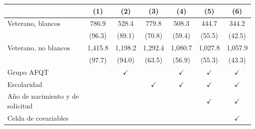 
\begin{tabular}{lcccccc}
\toprule
 & (1) & (2) & (3) & (4) & (5) & (6)\\
\midrule
Veterano, blancos & 786.9 & 528.4 & 779.8 & 508.3 & 444.7 & 344.2\\
 & (96.3) & (89.1) & (70.8) & (59.4) & (55.5) & (42.5)\\
Veterano, no blancos & 1,415.8 & 1,198.2 & 1,292.4 & 1,080.7 & 1,027.8 & 1,057.9\\
 & (97.7) & (94.0) & (63.5) & (56.9) & (55.3) & (43.3)\\
Grupo AFQT &  & $\checkmark$ &  & $\checkmark$ & $\checkmark$ & $\checkmark$\\
Escolaridad &  &  & $\checkmark$ & $\checkmark$ & $\checkmark$ & $\checkmark$\\
A\~no de nacimiento y de solicitud &  &  &  &  & $\checkmark$ & $\checkmark$\\
Celda de covariables &  &  &  &  &  & $\checkmark$\\
\bottomrule
\end{tabular}
